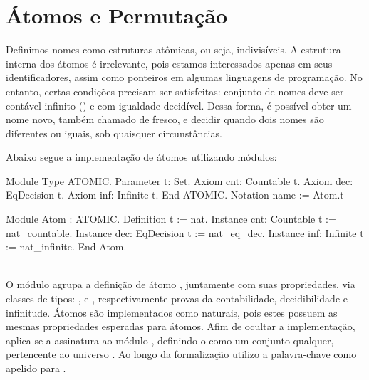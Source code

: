 


\section{Átomos e Permutação}\label{sec:atomos-permutacao}
Definimos nomes como estruturas atômicas, ou seja, indivisíveis. A estrutura interna dos átomos é irrelevante, pois estamos interessados apenas em seus identificadores, assim como ponteiros em algumas linguagens de programação. No entanto, certas condições precisam ser satisfeitas: conjunto de nomes deve ser contável infinito () e com igualdade decidível. Dessa forma, é possível obter um nome novo, também chamado de fresco, e decidir quando dois nomes são diferentes ou iguais, sob quaisquer circunstâncias.

Abaixo segue a implementação de átomos utilizando módulos:
\vspace*{.4em}\\
\begin{minipage}[t]{0.5\linewidth}
\begin{coqcode}
Module Type ATOMIC.
  Parameter t: Set.
  Axiom cnt: Countable t.
  Axiom dec: EqDecision t.
  Axiom inf: Infinite t.
End ATOMIC.
Notation name := Atom.t
\end{coqcode}
\end{minipage}
\hspace{-5em}
\begin{minipage}[t]{0.5\linewidth}
\begin{coqcode}
Module Atom : ATOMIC.
  Definition t := nat.
  Instance cnt: Countable t := nat_countable.
  Instance dec: EqDecision t := nat_eq_dec.
  Instance inf: Infinite t := nat_infinite.
End Atom.
\end{coqcode}
\end{minipage}
\vspace*{1em}\\
O módulo  agrupa a definição de átomo , juntamente com suas propriedades, via classes de tipos: ,  e , respectivamente provas da contabilidade, decidibilidade e infinitude. Átomos são implementados como naturais, pois estes possuem as mesmas propriedades esperadas para átomos. Afim de ocultar a implementação, aplica-se a assinatura  ao módulo , definindo-o como um conjunto qualquer, pertencente ao universo . Ao longo da formalização utilizo a palavra-chave  como apelido para . 

